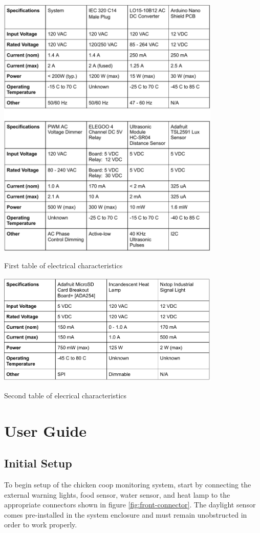 \documentclass{article}
\begin{document}
\begin{table}[H]
    \centering
    \includegraphics[width=0.8\textwidth]{fig/electrical-chars-1.pdf}
    \caption{First table of electrical characteristics}
    \label{fig:electric-char-1}
\end{table}

\begin{table}[H]
    \centering
    \includegraphics[width=0.8\textwidth]{fig/electrical-chars-2.pdf}
    \caption{Second table of elecrical characteristics}
    \label{fig:electric-char-2}
\end{table}


\section{User Guide}
\subsection{Initial Setup}
To begin setup of the chicken coop monitoring system, start by connecting the external warning lights, food sensor, water sensor, and heat lamp to the appropriate connectors shown in figure \ref{fig:front-connector}.  The daylight sensor comes pre-installed in the system enclosure and must remain unobstructed in order to work properly.
\end{document}
